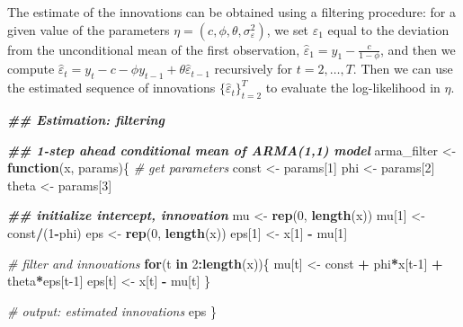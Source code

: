 \documentclass[
]{book}
\newenvironment{Shaded}{\begin{snugshade}}{\end{snugshade}}
\newcommand{\CommentTok}[1]{\textcolor[rgb]{0.56,0.35,0.01}{\textit{#1}}}
\newcommand{\ControlFlowTok}[1]{\textcolor[rgb]{0.13,0.29,0.53}{\textbf{#1}}}
\newcommand{\DecValTok}[1]{\textcolor[rgb]{0.00,0.00,0.81}{#1}}
\newcommand{\DocumentationTok}[1]{\textcolor[rgb]{0.56,0.35,0.01}{\textbf{\textit{#1}}}}
\newcommand{\FunctionTok}[1]{\textcolor[rgb]{0.13,0.29,0.53}{\textbf{#1}}}
\newcommand{\NormalTok}[1]{#1}
\newcommand{\OtherTok}[1]{\textcolor[rgb]{0.56,0.35,0.01}{#1}}
\newcommand{\SpecialCharTok}[1]{\textcolor[rgb]{0.81,0.36,0.00}{\textbf{#1}}}
\begin{document}
The estimate of the innovations can be obtained using a filtering procedure: for a given value of the parameters \(\eta = (c, \phi, \theta, \sigma^2_\varepsilon)\), we set \(\hat\varepsilon_1\) equal to the deviation from the unconditional mean of the first observation, \(\hat\varepsilon_1 = y_1 - \frac{c}{1-\phi}\), and then we compute \(\hat\varepsilon_{t} = y_t - c - \phi y_{t-1} + \theta \hat\varepsilon_{t-1}\) recursively for \(t = 2, \dots, T\). Then we can use the estimated sequence of innovations \(\{\hat\varepsilon_t\}_{t=2}^T\) to evaluate the log-likelihood in \(\eta\).

\begin{Shaded}
\begin{Highlighting}[]
\DocumentationTok{\#\# Estimation: filtering}

\DocumentationTok{\#\# 1{-}step ahead conditional mean of ARMA(1,1) model}
\NormalTok{arma\_filter }\OtherTok{\textless{}{-}} \ControlFlowTok{function}\NormalTok{(x, params)\{}
  \CommentTok{\# get parameters}
\NormalTok{  const }\OtherTok{\textless{}{-}}\NormalTok{ params[}\DecValTok{1}\NormalTok{]}
\NormalTok{  phi }\OtherTok{\textless{}{-}}\NormalTok{ params[}\DecValTok{2}\NormalTok{]}
\NormalTok{  theta }\OtherTok{\textless{}{-}}\NormalTok{ params[}\DecValTok{3}\NormalTok{]}

  \DocumentationTok{\#\# initialize intercept, innovation}
\NormalTok{  mu }\OtherTok{\textless{}{-}} \FunctionTok{rep}\NormalTok{(}\DecValTok{0}\NormalTok{, }\FunctionTok{length}\NormalTok{(x))}
\NormalTok{  mu[}\DecValTok{1}\NormalTok{] }\OtherTok{\textless{}{-}}\NormalTok{ const}\SpecialCharTok{/}\NormalTok{(}\DecValTok{1}\SpecialCharTok{{-}}\NormalTok{phi)}
\NormalTok{  eps }\OtherTok{\textless{}{-}} \FunctionTok{rep}\NormalTok{(}\DecValTok{0}\NormalTok{, }\FunctionTok{length}\NormalTok{(x))}
\NormalTok{  eps[}\DecValTok{1}\NormalTok{] }\OtherTok{\textless{}{-}}\NormalTok{ x[}\DecValTok{1}\NormalTok{] }\SpecialCharTok{{-}}\NormalTok{ mu[}\DecValTok{1}\NormalTok{]}

  \CommentTok{\# filter and innovations}
  \ControlFlowTok{for}\NormalTok{(t }\ControlFlowTok{in} \DecValTok{2}\SpecialCharTok{:}\FunctionTok{length}\NormalTok{(x))\{}
\NormalTok{    mu[t] }\OtherTok{\textless{}{-}}\NormalTok{ const }\SpecialCharTok{+}\NormalTok{ phi}\SpecialCharTok{*}\NormalTok{x[t}\DecValTok{{-}1}\NormalTok{] }\SpecialCharTok{+}\NormalTok{ theta}\SpecialCharTok{*}\NormalTok{eps[t}\DecValTok{{-}1}\NormalTok{]}
\NormalTok{    eps[t] }\OtherTok{\textless{}{-}}\NormalTok{ x[t] }\SpecialCharTok{{-}}\NormalTok{ mu[t]}
\NormalTok{  \}}

  \CommentTok{\# output: estimated innovations}
\NormalTok{  eps}
\NormalTok{\}}
\end{Highlighting}
\end{Shaded}
\end{document}
